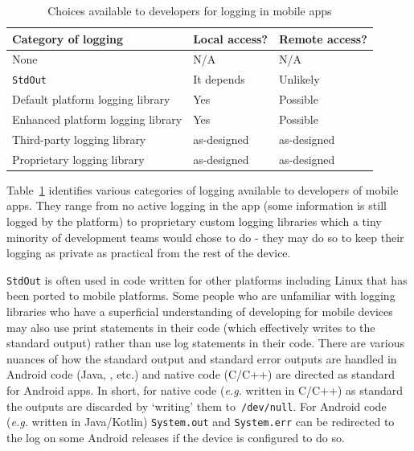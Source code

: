 \begin{table} %
    \centering
    \begin{tabular}{lll}
         Category of logging &Local access?  &Remote access? \\
         \hline
         None            &N/A  &N/A \\
         \texttt{StdOut} &It depends &Unlikely \\
         Default platform logging library &Yes &Possible \\
         Enhanced platform logging library &Yes &Possible \\
         Third-party logging library &as-designed &as-designed \\
         Proprietary logging library &as-designed &as-designed \\
         
    \end{tabular}
    \caption{Choices available to developers for logging in mobile apps}
    \label{tab:logging-choices-for-devs}
\end{table}

Table~\ref{tab:logging-choices-for-devs} identifies various categories of logging available to developers of mobile apps. They range from no active logging in the app (some information is still logged by the platform) to proprietary custom logging libraries which a tiny minority of development teams would chose to do - they may do so to keep their logging as private as practical from the rest of the device.

\texttt{StdOut} is often used in code written for other platforms including Linux that has been ported to mobile platforms. Some people who are unfamiliar with logging libraries who have a superficial understanding of developing for mobile devices may also use print statements in their code (which effectively writes to the standard output) rather than use log statements in their code. There are various nuances of how the standard output and standard error outputs are handled in Android code (Java, , etc.) and native code (C/C++) are directed as standard for Android apps. In short, for native code (\emph{e.g.} written in C/C++) as standard the outputs are discarded by `writing' them to~\texttt{/dev/null}. For Android code (\emph{e.g.} written in Java/Kotlin) \texttt{System.out} and \texttt{System.err} can be redirected to the log on some Android releases if the device is configured to do so.

